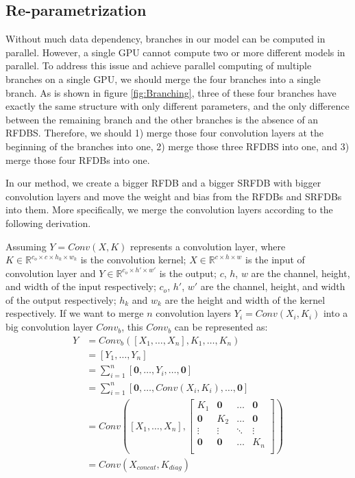 \documentclass[10pt,twocolumn,letterpaper]{article}
\begin{document}
\subsection{Re-parametrization}
Without much data dependency, branches in our model can be computed in parallel. 
However, a single GPU cannot compute two or more different models in parallel. 
To address this issue and achieve parallel computing of multiple branches on a single GPU, we should merge the four branches into a single branch. 
As is shown in figure \ref{fig:Branching}, three of these four branches have exactly the same structure with only different parameters, and the only difference between the remaining branch and the other branches is the absence of an RFDBS.
Therefore, we should 1) merge those four convolution layers at the beginning of the branches into one, 2) merge those three RFDBS into one, and 3) merge those four RFDBs into one.

In our method, we create a bigger RFDB and a bigger SRFDB with bigger convolution layers and move the weight and bias from the RFDBs and SRFDBs into them.
More specifically, we merge the convolution layers according to the following derivation.

Assuming $Y=Conv(X, K)$ represents a convolution layer,
where $K\in\mathbb{R}^{c_o\times c\times h_k\times w_k}$ is the convolution kernel; $X\in\mathbb{R}^{c\times h\times w}$ is the input of convolution layer and $Y\in\mathbb{R}^{c_o\times h'\times w'}$ is the output; 
$c$, $h$, $w$ are the channel, height, and width of the input respectively; 
$c_o$, $h'$, $w'$ are the channel, height, and width of the output respectively;
$h_k$ and $w_k$ are the height and width of the kernel respectively.
If we want to merge $n$ convolution layers $Y_i=Conv(X_i, K_i)$ into a big convolution layer $Conv_b$, this $Conv_b$ can be represented as:
\begin{equation}
  \begin{aligned}
    Y&=Conv_b([X_1,\dots,X_n], K_1,\dots,K_n)\\
    &=[Y_1,\dots,Y_n]\\
    &=\sum_{i=1}^n[\bm 0,\dots,Y_i,\dots,\bm 0]\\
    &=\sum_{i=1}^n[\bm 0,\dots,Conv(X_i, K_i),\dots,\bm 0]\\
    &=Conv([X_1,\dots,X_n], 
    \begin{bmatrix}
      K_1 & \bm 0 & \dots & \bm 0 \\
      \bm 0 & K_2 & \dots & \bm 0 \\
      \vdots & \vdots & \ddots & \vdots \\
      \bm 0 & \bm 0 & \dots & K_n \\
    \end{bmatrix})\\
    &=Conv(X_{concat}, K_{diag})
  \end{aligned}
\end{equation}
\end{document}
